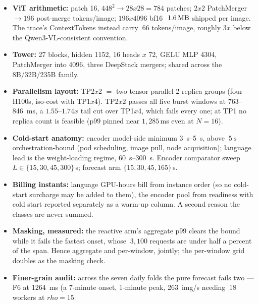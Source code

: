 \documentclass[11pt,a4paper]{article}
\def\times{x}\def\rho{rho}\def\approx{~}\def\leq{<=}\def\geq{>=}%
\def\emph#1{#1}\def\texttt#1{#1}%
\begin{document}
\begin{itemize}
  polynomial (8.3\,req/s), both ITL-bound with $1.8$--$2.1\times$ TTFT slack
  remaining; at the calibrated language knee the encoder idles at 4.5\%
  utilization; on the burst window neither pool has a knee (language
  \SI{1868}{\milli\second}, vision \SI{5013}{\milli\second} at $s{=}1$).
\item \textbf{ViT arithmetic:} patch 16, $448^2 \to 28\times28 = 784$
  patches; $2\times2$ PatchMerger $\to 196$ post-merge tokens/image;
  $196\times4096$ bf16 ${\approx}\SI{1.6}{\mega\byte}$ shipped per image. The
  trace's \texttt{ContextTokens} instead carry ${\approx}66$ tokens/image,
  roughly $3\times$ below the Qwen3-VL-consistent convention.
\item \textbf{Tower:} 27 blocks, hidden 1152, 16 heads $\times$ 72,
  GELU MLP 4304, PatchMerger into 4096, three DeepStack mergers; shared
  across the 8B/32B/235B family.
\item \textbf{Parallelism layout:} TP2$\times$2 $=$ two tensor-parallel-2
  replica groups (four H100s, iso-cost with TP1$\times$4). TP2$\times$2
  passes all five burst windows at 763--\SI{846}{\milli\second}, a
  $1.55$--$1.74\times$ tail cut over TP1$\times$4, which fails every one; at
  TP1 no replica count is feasible (p99 pinned near $1{,}285$\,ms even at
  $N{=}16$).
\item \textbf{Cold-start anatomy:} encoder model-side minimum
  \SIrange{3}{5}{\second}, above ${\approx}\SI{5}{\second}$
  orchestration-bound (pod scheduling, image pull, node acquisition);
  language lead is the weight-loading regime, \SIrange{60}{300}{\second}.
  Encoder comparator sweep $L\in\{15,30,45,300\}$\,s; forecast arm
  $\{15,30,45,165\}$\,s.
\item \textbf{Billing instants:} language GPU-hours bill from instance
  \emph{order} (so no cold-start surcharge may be added to them), the encoder
  pool from \emph{readiness} with cold start reported separately as a warm-up
  column. A second reason the classes are never summed.
\item \textbf{Masking, measured:} the reactive arm's aggregate p99 clears the
  bound while it fails the fastest onset, whose ${\approx}3{,}100$ requests
  are under half a percent of the span. Hence aggregate \emph{and}
  per-window, jointly; the per-window grid doubles as the masking check.
\item \textbf{Finer-grain audit:} across the seven daily folds the pure
  forecast fails two --- F6 at \SI{1264}{\milli\second} (a 7-minute onset,
  1-minute peak, \SI{263}{img/s} needing ${\approx}18$ workers at $\rho{=}15$

\end{itemize}
\end{document}
